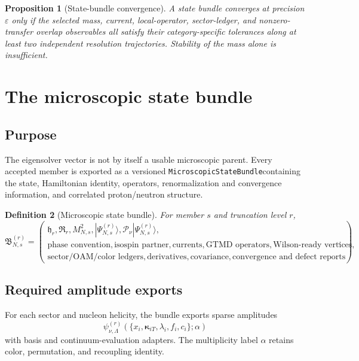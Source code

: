 \documentclass[11pt]{article}
\newtheorem{definition}{Definition}[section]
\newtheorem{proposition}[definition]{Proposition}
\newcommand{\cP}{\mathcal P}
\newcommand{\eps}{\varepsilon}
\newcommand{\StateBundle}{\texttt{MicroscopicStateBundle}}
\begin{document}
\begin{proposition}[State-bundle convergence]
A state bundle converges at precision \(\eps\) only if the selected mass,
current, local-operator, sector-ledger, and nonzero-transfer overlap observables
all satisfy their category-specific tolerances along at least two independent
resolution trajectories.  Stability of the mass alone is insufficient.
\label{prop:bundle-convergence}
\end{proposition}

\section{The microscopic state bundle}
\label{sec:state-bundle}

\subsection{Purpose}

The eigensolver vector is not by itself a usable microscopic parent.  Every
accepted member is exported as a versioned \StateBundle containing the state,
Hamiltonian identity, operators, renormalization and convergence information,
and correlated proton/neutron structure.

\begin{definition}[Microscopic state bundle]
For member \(s\) and truncation level \(r\),
\begin{equation}
 \mathfrak B_{N,s}^{(r)}=
 \left(
 \begin{gathered}
 \mathfrak h_r,\mathfrak R_r,
 M_{N,s}^{2},|\Psi_{N,s}^{(r)}\rangle,
 \cP_{\nu}|\Psi_{N,s}^{(r)}\rangle,\\
 \text{phase convention},\text{isospin partner},
 \text{currents},\text{GTMD operators},\text{Wilson-ready vertices},\\
 \text{sector/OAM/color ledgers},
 \text{derivatives},\text{covariance},
 \text{convergence and defect reports}
 \end{gathered}
 \right).
 \label{eq:state-bundle}
\end{equation}
\end{definition}

\subsection{Required amplitude exports}

For each sector and nucleon helicity, the bundle exports sparse amplitudes
\begin{equation}
 \psi_{\nu,\Lambda}^{(r)}
 \left(
 \{x_i,\bm\kappa_{iT},\lambda_i,f_i,c_i\};\alpha
 \right)
 \label{eq:exported-amplitudes}
\end{equation}
with basis and continuum-evaluation adapters.  The multiplicity label \(\alpha\)
retains color, permutation, and recoupling identity.
\end{document}
